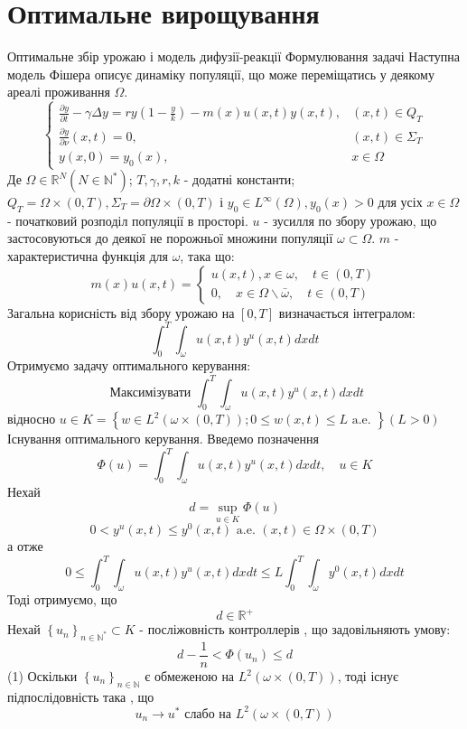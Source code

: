 \documentclass[a4paper,12pt]{extreport}
\begin{document}
\section{Оптимальне вирощування}
Оптимальне збір урожаю і модель дифузії-реакції
Формулювання задачі
Наступна модель Фішера описує динаміку популяції, що може переміщатись у деякому ареалі проживання $\Omega$.
$$
\begin{cases}\frac{\partial y}{\partial t}-\gamma \Delta y=r y\left(1-\frac{y}{k}\right)-m(x) u(x, t) y(x, t), & (x, t) \in Q_T \\ \frac{\partial y}{\partial \nu}(x, t)=0, & (x, t) \in \Sigma_T \\ y(x, 0)=y_0(x), & x \in \Omega\end{cases}
$$
Де  $\Omega \in \mathbb{R}^N\left(N \in \mathbb{N}^*\right)$; $T, \gamma, r, k$ - додатні константи; $Q_T=\Omega \times(0, T), \Sigma_T=\partial \Omega \times(0, T)$ і 
$y_0 \in L^{\infty}(\Omega), y_0(x)>0 \text { для усіх } x \in \Omega$ - початковий розподіл популяції в просторі. 
$u$ - зусилля по збору урожаю, що застосовуються до деякої не порожньої множини популяції $\omega \subset \Omega$. 
$m$ - характеристична функція для $\omega$, така що:
$$
m(x) u(x, t)=\left\{\begin{array}{l}
u(x, t), x \in \omega, \quad t \in(0, T) \\
0, \quad x \in \Omega \backslash \bar{\omega}, \quad t \in(0, T)
\end{array}\right.
$$
Загальна корисність від збору урожаю на $[0, T]$ визначається інтегралом:
$$
\int_0^T \int_\omega u(x, t) y^u(x, t) d x d t
$$
Отримуємо задачу оптимального керування:
$$
\text { Максимізувати } \int_0^T \int_\omega u(x, t) y^u(x, t) d x d t
$$
відносно $u \in K=\left\{w \in L^2(\omega \times(0, T)) ; 0 \leq w(x, t) \leq L \text { a.e. }\right\}(L>0)$
Існування оптимального керування.
Введемо позначення
$$
\Phi(u)=\int_0^T \int_\omega u(x, t) y^u(x, t) d x d t, \quad u \in K
$$
Нехай
$$
d=\sup _{u \in K} \Phi(u)
$$
$$
0<y^u(x, t) \leq y^0(x, t) \text { a.e. }(x, t) \in \Omega \times(0, T)
$$
  а отже
$$
0 \leq \int_0^T \int_\omega u(x, t) y^u(x, t) d x d t \leq L \int_0^T \int_\omega y^0(x, t) d x d t
$$
Тоді отримуємо, що 
$$
d \in \mathbb{R}^{+}
$$
Нехай $\left\{u_n\right\}_{n \in \mathbb{N}^*} \subset K$ - посліжовність контроллерів , що задовільняють умову:
$$
d-\frac{1}{n}<\Phi\left(u_n\right) \leq d
$$ (1)
Оскільки $\left\{u_n\right\}_{n \in \mathbb{N}}$ є обмеженою на $L^2(\omega \times(0, T))$, тоді існує підпослідовність така , що 
$$
u_n \longrightarrow u^* \text { слабо на } L^2(\omega \times(0, T))
$$
\end{document}
